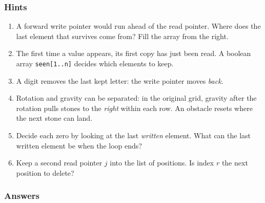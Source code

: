 \subsubsection*{Hints}
\begin{enumerate}[leftmargin=*, label=\textbf{E2.\arabic*}]
    \item A forward write pointer would run ahead of the read pointer. Where does the last element that survives come from? Fill the array from the right.
    \item The first time a value appears, its first copy has just been read. A boolean array \texttt{seen[1..n]} decides which elements to keep.
    \item A digit removes the last kept letter: the write pointer moves \emph{back}.
    \item Rotation and gravity can be separated: in the original grid, gravity after the rotation pulls stones to the \emph{right} within each row. An obstacle resets where the next stone can land.
    \item Decide each zero by looking at the last \emph{written} element. What can the last written element be when the loop ends?
    \item Keep a second read pointer $j$ into the list of positions. Is index $r$ the next position to delete?
\end{enumerate}

\subsubsection*{Answers}

